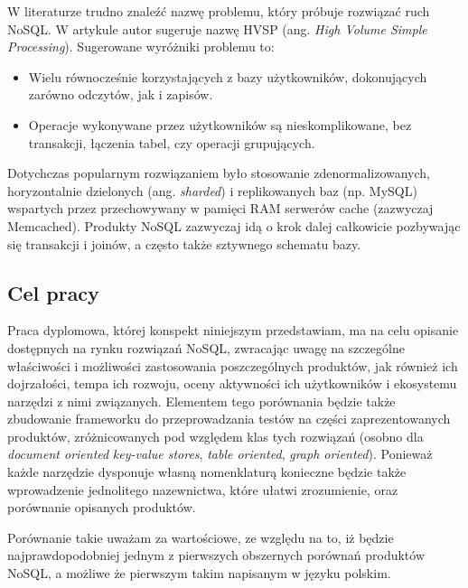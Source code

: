 \documentclass[a4paper,11pt]{article}
\begin{document}
W literaturze trudno znaleźć nazwę problemu, który próbuje rozwiązać ruch
NoSQL. W artykule \cite{monash-db-hvsp} autor sugeruje nazwę HVSP (ang.
\emph{High Volume Simple Processing}). Sugerowane wyróżniki problemu to:
\begin{itemize}
 \item Wielu równocześnie korzystających z bazy użytkowników, dokonujących
zarówno odczytów, jak i zapisów.
 \item Operacje wykonywane przez użytkowników są nieskomplikowane, bez
transakcji, łączenia tabel, czy operacji grupujących.
\end{itemize}

Dotychczas popularnym rozwiązaniem było stosowanie zdenormalizowanych,
horyzontalnie dzielonych (ang. \emph{sharded}) i replikowanych baz (np. MySQL)
wspartych przez przechowywany w pamięci RAM serwerów cache (zazwyczaj
Memcached). Produkty NoSQL zazwyczaj idą o krok dalej całkowicie pozbywając się
transakcji i joinów, a często także sztywnego schematu bazy.

\subsection*{Cel pracy}
Praca dyplomowa, której konspekt niniejszym przedstawiam, ma na celu opisanie
dostępnych na rynku rozwiązań NoSQL, zwracając uwagę na szczególne właściwości
i możliwości zastosowania poszczególnych produktów, jak również ich
dojrzałości, tempa ich rozwoju, oceny aktywności ich użytkowników i ekosystemu
narzędzi z nimi związanych. Elementem tego porównania będzie także zbudowanie
frameworku do przeprowadzania testów na części zaprezentowanych produktów,
zróżnicowanych pod względem klas tych rozwiązań (osobno dla \emph{document
oriented} \emph{key-value stores}, \emph{table oriented}, \emph{graph
oriented}). Ponieważ każde narzędzie dysponuje własną nomenklaturą konieczne
będzie także wprowadzenie jednolitego nazewnictwa, które ułatwi zrozumienie,
oraz porównanie opisanych produktów.

Porównanie takie uważam za wartościowe, ze względu na to, iż będzie
najprawdopodobniej jednym z pierwszych obszernych porównań produktów NoSQL, a
możliwe że pierwszym takim napisanym w języku polskim.
  
\end{document}
